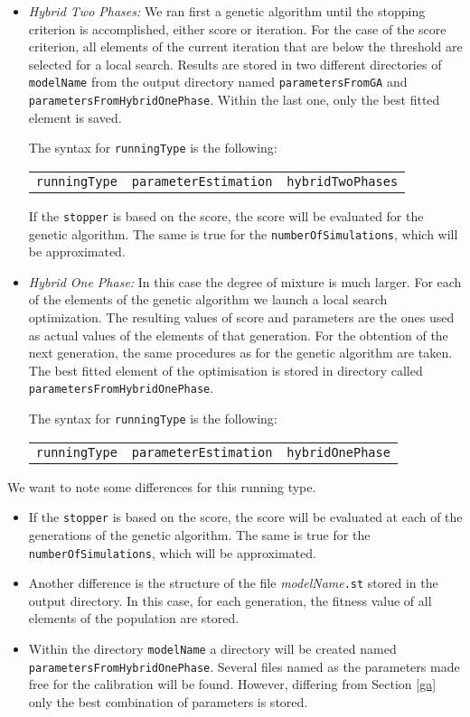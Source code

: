 \documentclass[a4paper, 11pt]{article}
\begin{document}
\begin{itemize}
\item \emph{Hybrid Two Phases:}
  We ran first a genetic algorithm until the stopping criterion is accomplished, either score or iteration.
  For the case of the score criterion, all elements of the current iteration that are below the threshold are selected for a local search. 
  Results are stored in two different directories of \texttt{modelName} from the output directory named \texttt{parametersFromGA} and \texttt{parametersFromHybridOnePhase}.
  Within the last one, only the best fitted element is saved.

  The syntax for \texttt{runningType} is the following:\\[1.5ex]
  \begin{tabular}{ccc}\texttt{runningType}&\texttt{parameterEstimation}&\texttt{hybridTwoPhases}\end{tabular}

If the \texttt{stopper} is based on the score, the score will be evaluated for the genetic algorithm. 
The same is true for the \texttt{numberOfSimulations}, which will be approximated.
\item \emph{Hybrid One Phase:}
  In this case the degree of mixture is much larger.
  For each of the elements of the genetic algorithm we launch a local search optimization. 
  The resulting values of score and parameters are the ones used as actual values of the elements of that generation. 
  For the obtention of the next generation, the same procedures as for the genetic algorithm are taken.
  The best fitted element of the optimisation is stored in directory called \texttt{parametersFromHybridOnePhase}.
  
  The syntax for \texttt{runningType} is the following:\\[1.5ex]
  \begin{tabular}{ccc}\texttt{runningType}&\texttt{parameterEstimation}&\texttt{hybridOnePhase}\end{tabular}
\end{itemize}
We want to note some differences for this running type.
\begin{itemize}
  \item 
    If the \texttt{stopper} is based on the score, the score will be evaluated at each of the generations of the genetic algorithm.
    The same is true for the \texttt{numberOfSimulations}, which will be approximated.
\item 
  Another difference is the structure of the file \textit{modelName}\texttt{.st} stored in the output directory.
  In this case, for each generation, the fitness value of all elements of the population are stored.
\item
  Within the directory \texttt{modelName} a directory will be created named \texttt{parametersFromHybridOnePhase}.
  Several files named as the parameters made free for the calibration will be found. 
  However, differing from Section \ref{ga} only the best combination of parameters is stored.
\end{itemize}
\end{document}
